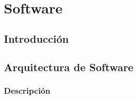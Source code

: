\chapter{Software}

\section{Introducción}

\section{Arquitectura de Software}
\subsection{Descripción}

